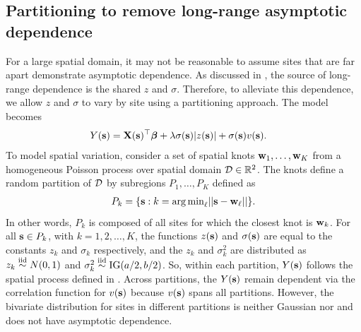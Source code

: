 \subsection{Partitioning to remove long-range asymptotic dependence}\label{sts:part}
For a large spatial domain, it may not be reasonable to assume sites that are far apart demonstrate asymptotic dependence.%
As discussed in , the source of long-range dependence is the shared $z$ and $\sigma$.
Therefore, to alleviate this dependence, we allow $z$ and $\sigma$ to vary by site using a partitioning approach.
The model becomes
\begin{align} \label{steq:partition}
  Y(\mathbf{s}) &= \mathbf{X}(\mathbf{s})^\top \mbox{\boldmath $\beta$} + \lambda \sigma(\mathbf{s}) |z(\mathbf{s})| + \sigma(\mathbf{s}) v(\mathbf{s}).
\end{align}
To model spatial variation, consider a set of spatial knots $\mathbf{w}_1, \ldots, \mathbf{w}_K$ from a homogeneous Poisson process over spatial domain ${\cal D} \in \mathbb{R}^2$.
The knots define a random partition of ${\cal D}$ by subregions $P_{1}, \ldots, P_{K}$ defined as
\begin{align} \label{steq:subregions}
  P_{k} = \{ \mathbf{s} : k = {\mathop{\rm arg\, min}}_\ell || \mathbf{s} - \mathbf{w}_{\ell} || \}.
\end{align}
In other words, $P_k$ is composed of all sites for which the closest knot is $\mathbf{w}_k$.
For all $\mathbf{s} \in P_k$, with $k = 1, 2, \ldots, K$, the functions $z(\mathbf{s})$ and $\sigma(\mathbf{s})$ are equal to the constants $z_k$ and $\sigma_k$ respectively, and the $z_k$ and $\sigma^2_k$ are distributed as $z_k \stackrel{\mathrm{iid}}{\sim} N(0, 1)$ and $\sigma^2_k \stackrel{\mathrm{iid}}{\sim} \mathrm{IG}(a / 2, b / 2)$.
So, within each partition, $Y(\mathbf{s})$ follows the spatial \skewt process defined in .
Across partitions, the $Y(\mathbf{s})$ remain dependent via the correlation function for $v(\mathbf{s})$ because $v(\mathbf{s})$ spans all partitions.
However, the bivariate distribution for sites in different partitions is neither Gaussian nor \skewt and does not have asymptotic dependence.

